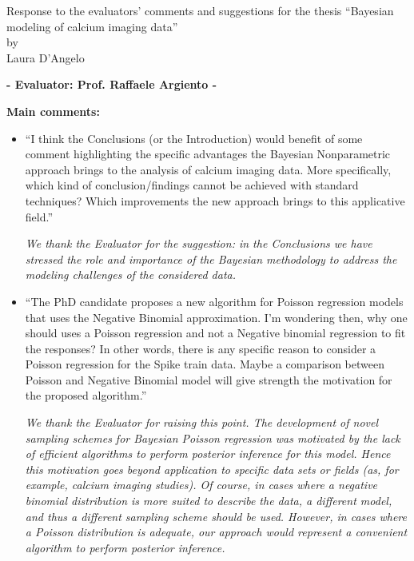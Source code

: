 \documentclass[11pt]{letter}
\begin{document}
\begin{center}
	{\large \sc Response to the evaluators' comments and suggestions for the thesis} \newline ``Bayesian modeling of calcium imaging data'' \\
	{\sc by} \\
	Laura D'Angelo
	\vspace*{1cm}
\end{center}

\begin{center}
{\large\bf - Evaluator: Prof. Raffaele Argiento -}
\end{center}

{\bf Main comments:}
%
\begin{itemize}
	
%
\item ``I think the Conclusions (or the Introduction) would benefit of some comment highlighting the specific advantages the Bayesian Nonparametric approach brings to the analysis of calcium imaging data. More specifically, which kind of conclusion/findings cannot be achieved with standard techniques? Which
improvements the new approach brings to this applicative field.''\vskip1mm

{\em 
	We thank the Evaluator for the suggestion: in the Conclusions we have stressed the role and importance of the Bayesian methodology to address the modeling challenges of the considered data.
	}
\vskip3mm

%
\item ``The PhD candidate proposes a new algorithm for Poisson regression models that uses the Negative Binomial approximation. I'm wondering then, why one should uses a Poisson regression and not a Negative binomial regression to fit the responses?
In other words, there is any specific reason to consider a Poisson regression for the Spike train data. Maybe a comparison between Poisson and Negative Binomial model will give strength the motivation for the proposed algorithm.''
\vskip1mm

{\em 
	We thank the Evaluator for raising this point. The development of novel sampling schemes for Bayesian Poisson regression was motivated by the lack of efficient algorithms to perform posterior inference for this model. Hence this motivation goes beyond application to specific data sets or fields (as, for example, calcium imaging studies). Of course, in cases where a negative binomial distribution is more suited to describe the data, a different model, and thus a different sampling scheme should be used. However, in cases where a Poisson distribution is adequate, our approach would represent a convenient algorithm to perform posterior inference.
}
\vskip3mm


\end{itemize}
\end{document}
